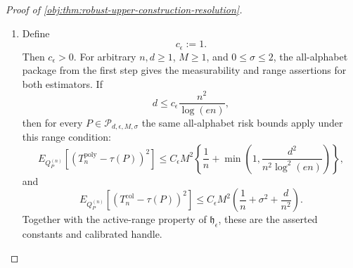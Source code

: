 \begin{proof}[Proof of \cref{obj:thm:robust-upper-construction-resolution}]
\begin{enumerate}
Set
\[
C_\epsilon:=\max\{C_{\mathrm{poly},\epsilon},
                 C_{\mathrm{col},\epsilon}\}.
\]
Then \(C_\epsilon>0\).  The two displayed rate factors are nonnegative for
\(n,d\ge1\) and \(0\le\sigma\le2\), and \(M^2\ge0\); hence replacing
\(C_{\mathrm{poly},\epsilon}\) and \(C_{\mathrm{col},\epsilon}\) by
\(C_\epsilon\) preserves the two upper bounds. %

\item Define
\[
c_\epsilon:=1.
\]
Then \(c_\epsilon>0\).  For arbitrary \(n,d\ge1\), \(M\ge1\), and
\(0\le\sigma\le2\), the all-alphabet package from the first step gives the
measurability and range assertions for both estimators.  If
\[
d\le c_\epsilon\frac{n^2}{\log(en)},
\]
then for every \(P\in\mathcal P_{d,\epsilon,M,\sigma}\) the same all-alphabet
risk bounds apply under this range condition:
\[
E_{Q_P^{(n)}}\!\left[
\left(T_n^{\mathrm{poly}}-\tau(P)\right)^2
\right]
\le
C_\epsilon M^2
\left\{
\frac1n+
\min\left(1,\frac{d^2}{n^2\log^2(en)}\right)
\right\},
\]
and
\[
E_{Q_P^{(n)}}\!\left[
\left(T_n^{\mathrm{col}}-\tau(P)\right)^2
\right]
\le
C_\epsilon M^2
\left(
\frac1n+\sigma^2+\frac{d}{n^2}
\right).
\]
Together with the active-range property of \(\mathfrak h_\epsilon\), these are
the asserted constants and calibrated handle. %
\end{enumerate}
\end{proof}

